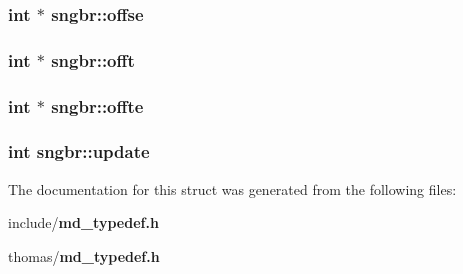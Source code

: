\subsubsection{\setlength{\rightskip}{0pt plus 5cm}int $\ast$ {\bf sngbr::offse}}\label{structsngbr_6581e2d18523b4f64955cf8e396f4595}


\subsubsection{\setlength{\rightskip}{0pt plus 5cm}int $\ast$ {\bf sngbr::offt}}\label{structsngbr_45e2a04fffb25b3f41a80e0c13f4c957}


\subsubsection{\setlength{\rightskip}{0pt plus 5cm}int $\ast$ {\bf sngbr::offte}}\label{structsngbr_53d46303dda79582e8f03af53b2e1e54}


\subsubsection{\setlength{\rightskip}{0pt plus 5cm}int {\bf sngbr::update}}\label{structsngbr_0c8dd542b5b596fdeb20c28bc2538ba6}




The documentation for this struct was generated from the following files:\begin{CompactItemize}
\item 
include/{\bf md\_\-typedef.h}\item 
thomas/{\bf md\_\-typedef.h}\end{CompactItemize}
